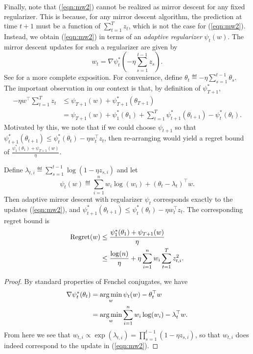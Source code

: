 \documentclass[paper_icml.tex]{subfiles}
\begin{document}
Finally, note that (\ref{eqn:mw2}) cannot be realized as mirror descent for any 
fixed regularizer. This is because, for any mirror descent algorithm, the 
prediction at time $t+1$ must be a function of $\sum_{t=1}^T z_t$, which is 
not the case for (\ref{eqn:mw2}). Instead, we obtain (\ref{eqn:mw2}) in terms of 
an \emph{adaptive regularizer} $\psi_t(w)$. The mirror descent updates for 
such a regularizer are given by 
\[ w_{t} = \nabla \psi_t^*\left(-\eta \sum_{s=1}^{t-1} z_s\right). \]
See \cite{orabona2013general} for a more complete exposition. For convenience, 
define $\theta_t \eqdef -\eta \sum_{s=1}^{t-1} \theta_s$. The important 
observation in our context is that, by definition of $\psi_{T+1}^*$, 
\begin{align}
- \eta w^{\top} \sum_{t=1}^T z_t &\leq \psi_{T+1}(w) + \psi_{T+1}^*(\theta_{T+1}) \\
 &= \psi_{T+1}(w) + \psi_1^*(\theta_1) + \sum_{t=1}^T \psi_{t+1}^*(\theta_{t+1}) - \psi_t^*(\theta_t).
\end{align}
Motivated by this, we note that if we could choose $\psi_{t+1}$ so that 
$\psi_{t+1}^*(\theta_{t+1}) \leq \psi_{t}^*(\theta_t) - \eta w_t^{\top}z_t$, 
then re-arranging would yield a regret bound of $\frac{\psi_1^*(\theta_1) + \psi_{T+1}(w)}{\eta}$.
\begin{proposition}
Define $\lambda_{t,i} \eqdef \sum_{s=1}^{t-1} \log(1-\eta z_{s,i})$ and let
\[ \psi_t(w) \eqdef \sum_{i=1}^n w_i\log(w_i) + (\theta_t - \lambda_t)^{\top}w. \]
Then adaptive mirror descent with regularizer $\psi_t$ corresponds exactly to 
the updates (\ref{eqn:mw2}), and 
$\psi_{t+1}^*(\theta_{t+1}) \leq \psi_t^*(\theta_t) - \eta w_t^{\top}z_t$. 
The corresponding regret bound is
\begin{align}
\operatorname{Regret}(w) &\leq \frac{\psi_1^*(\theta_1) + \psi_{T+1}(w)}{\eta} \\
 &\leq \frac{\log(n)}{\eta} + \eta \sum_{i=1}^n w_i \sum_{t=1}^T z_{t,i}^2.
\end{align}
\end{proposition}
\begin{proof}
By standard properties of Fenchel conjugates, we have
\begin{align}
\nabla \psi_t^*(\theta_t) &= \argmin_w \psi_t(w) - \theta_t^{\top}w \\
 &= \argmin_w \sum_{i=1}^n w_i\log(w_i) - \lambda_t^{\top}w.
\end{align}
From here we see that 
$w_{t,i} \propto \exp(\lambda_{t,i}) = \prod_{s=1}^{t-1} (1-\eta z_{s,i})$, 
so that $w_{t,i}$ does indeed correspond to the update in (\ref{eqn:mw2}). 
\end{proof}
\end{document}
